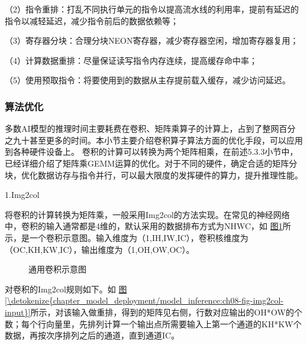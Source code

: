 \documentclass[letterpaper,10pt,english]{sphinxmanual}
\let\sphinxpxdimen\pdfpxdimen\else\newdimen\sphinxpxdimen
\begin{document}
\sphinxAtStartPar
（2）指令重排：打乱不同执行单元的指令以提高流水线的利用率，提前有延迟的指令以减轻延迟，减少指令前后的数据依赖等；

\sphinxAtStartPar
（3）寄存器分块：合理分块NEON寄存器，减少寄存器空闲，增加寄存器复用；

\sphinxAtStartPar
（4）计算数据重排：尽量保证读写指令内存连续，提高缓存命中率；

\sphinxAtStartPar
（5）使用预取指令：将要使用到的数据从主存提前载入缓存，减少访问延迟。


\subsubsection{算法优化}
\label{\detokenize{chapter_model_deployment/model_inference:id8}}
\sphinxAtStartPar
多数AI模型的推理时间主要耗费在卷积、矩阵乘算子的计算上，占到了整网百分之九十甚至更多的时间。本小节主要介绍卷积算子算法方面的优化手段，可以应用到各种硬件设备上。
卷积的计算可以转换为两个矩阵相乘，在前述5.3.3小节中，已经详细介绍了矩阵乘GEMM运算的优化。对于不同的硬件，确定合适的矩阵分块，优化数据访存与指令并行，可以最大限度的发挥硬件的算力，提升推理性能。

\sphinxAtStartPar
1.Img2col

\sphinxAtStartPar
将卷积的计算转换为矩阵乘，一般采用Img2col的方法实现。在常见的神经网络中，卷积的输入通常都是4维的，默认采用的数据排布方式为NHWC，如
\hyperref[\detokenize{chapter_model_deployment/model_inference:ch08-fig-conv-nhwc}]{图\ref{\detokenize{chapter_model_deployment/model_inference:ch08-fig-conv-nhwc}}}所示，是一个卷积示意图。输入维度为（1,IH,IW,IC），卷积核维度为（OC,KH,KW,IC），输出维度为（1,OH,OW,OC）。

\begin{figure}[H]
\centering
\capstart

\noindent\sphinxincludegraphics[width=800\sphinxpxdimen]{{conv_nhwc}.png}
\caption{通用卷积示意图}\label{\detokenize{chapter_model_deployment/model_inference:id12}}\label{\detokenize{chapter_model_deployment/model_inference:ch08-fig-conv-nhwc}}\end{figure}

\sphinxAtStartPar
对卷积的Img2col规则如下。如
\hyperref[\detokenize{chapter_model_deployment/model_inference:ch08-fig-img2col-input}]{图\ref{\detokenize{chapter_model_deployment/model_inference:ch08-fig-img2col-input}}}所示，对该输入做重排，得到的矩阵见右侧，行数对应输出的OH*OW的个数；每个行向量里，先排列计算一个输出点所需要输入上第一个通道的KH*KW个数据，再按次序排列之后的通道，直到通道IC。
\end{document}
